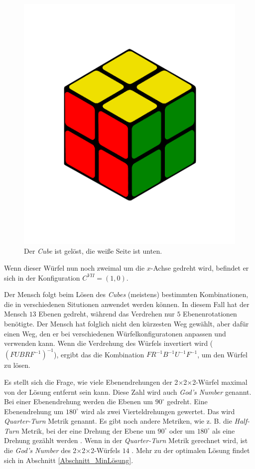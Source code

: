 \documentclass[12pt,a4paper, usenames, dvipsnames]{article}
\theoremstyle{mystyle}
\theoremstyle{definition}
\newcommand{\Ttwo}{2$\times$2$\times$2-}
\begin{document}
\begin{figure}[H]
\centering
\includegraphics[scale=0.12]{menschSchritt5.png}
\caption[Lösung von Mensch: Schritt 5]{Der \textit{Cube} ist gelöst, die weiße Seite ist unten.}
\label{Abbildung_LösungMensch5}
\end{figure} 

Wenn dieser Würfel nun noch zweimal um die $x$-Achse gedreht wird, befindet er sich in der Konfiguration $C^{VII} =(1,0)$.

Der Mensch folgt beim Lösen des \textit{Cubes} (meistens) bestimmten Kombinationen, die in verschiedenen Situtionen anwendet werden können.  
In diesem Fall hat der Mensch $13$ Ebenen gedreht, während das Verdrehen nur $5$ Ebenenrotationen benötigte. Der Mensch hat folglich nicht den kürzesten Weg gewählt, aber dafür einen Weg, den er bei verschiedenen Würfelkonfiguratonen anpassen und verwenden kann. 
Wenn die Verdrehung des Würfels invertiert wird ($(FUBRF^{-1})^{-1}$), ergibt das die Kombination $FR^{-1}B^{-1}U^{-1}F^{-1}$, um den Würfel zu lösen.


Es stellt sich die Frage, wie viele Ebenendrehungen der \Ttwo Würfel maximal von der Lösung entfernt sein kann. Diese Zahl wird auch \textit{God's Number} genannt. \\ 
Bei einer Ebenendrehung werden die Ebenen um $90^\circ$ gedreht. Eine Ebenendrehung um $180^\circ$ wird als zwei Vierteldrehungen gewertet. Das wird \textit{Quarter-Turn} Metrik genannt. Es gibt noch andere Metriken, wie z. B. die \textit{Half-Turn} Metrik, bei der eine Drehung der Ebene um $90^\circ$ oder um $180^\circ$ als eine Drehung gezählt werden \cite{TR}.
Wenn in der \textit{Quarter-Turn} Metrik gerechnet wird, ist die \textit{God's Number} des \Ttwo Würfels $14$ \cite{DJ}. Mehr zu der optimalen Lösung findet sich in Abschnitt \ref{Abschnitt_MinLösung}.
\end{document}
